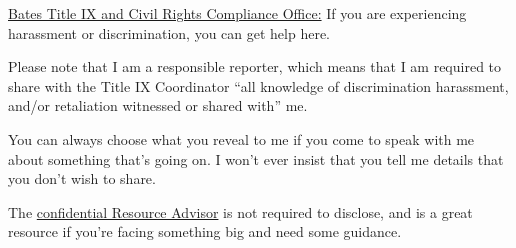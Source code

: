 \documentclass[
  letterpaper,
  DIV=11,
  numbers=noendperiod]{scrartcl}
\begin{document}
\href{https://www.bates.edu/here-to-help/}{Bates Title IX and Civil
Rights Compliance Office:} If you are experiencing harassment or
discrimination, you can get help here.

Please note that I am a responsible reporter, which means that I am
required to share with the Title IX Coordinator ``all knowledge of
discrimination harassment, and/or retaliation witnessed or shared with''
me.

You can always choose what you reveal to me if you come to speak with me
about something that's going on. I won't ever insist that you tell me
details that you don't wish to share.

The \href{https://www.bates.edu/here-to-help/cra/}{confidential Resource
Advisor} is not required to disclose, and is a great resource if you're
facing something big and need some guidance.
\end{document}
